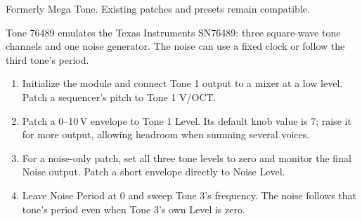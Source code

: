 Formerly Mega Tone. Existing patches and presets remain compatible.

Tone 76489 emulates the Texas Instruments SN76489: three square-wave tone
channels and one noise generator. The noise can use a fixed clock or follow
the third tone's period.

\begin{enumerate}
\item Initialize the module and connect Tone 1 output to a mixer at a low
level. Patch a sequencer's pitch to Tone 1 V/OCT.
\item Patch a 0--10\,V envelope to Tone 1 Level. Its default knob value is 7;
raise it for more output, allowing headroom when summing several voices.
\item For a noise-only patch, set all three tone levels to zero and monitor
the final Noise output. Patch a short envelope directly to Noise Level.
\item Leave Noise Period at 0 and sweep Tone 3's frequency. The noise follows
that tone's period even when Tone 3's own Level is zero.
\end{enumerate}
